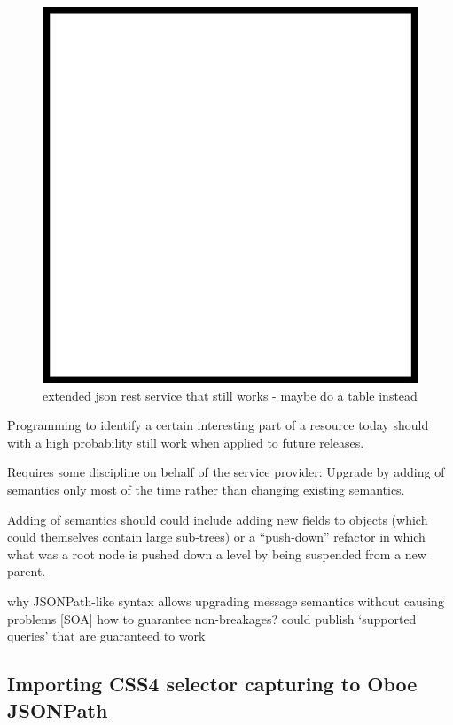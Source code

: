 \documentclass[]{article}
\makeatletter
\def\maxwidth{\ifdim\Gin@nat@width>\linewidth\linewidth
\else\Gin@nat@width\fi}
\let\Oldincludegraphics\includegraphics
\renewcommand{\includegraphics}[1]{\Oldincludegraphics[width=\maxwidth]{#1}}
\makeatother
\begin{document}
\begin{figure}[htbp]
\centering
\includegraphics{images/placeholder.png}
\caption{extended json rest service that still works - maybe do a table
instead \label{enhancingrest}}
\end{figure}

Programming to identify a certain interesting part of a resource today
should with a high probability still work when applied to future
releases.

Requires some discipline on behalf of the service provider: Upgrade by
adding of semantics only most of the time rather than changing existing
semantics.

Adding of semantics should could include adding new fields to objects
(which could themselves contain large sub-trees) or a ``push-down''
refactor in which what was a root node is pushed down a level by being
suspended from a new parent.

why JSONPath-like syntax allows upgrading message semantics without
causing problems {[}SOA{]} how to guarantee non-breakages? could publish
`supported queries' that are guaranteed to work

\subsection{Importing CSS4 selector capturing to Oboe JSONPath}
\end{document}
